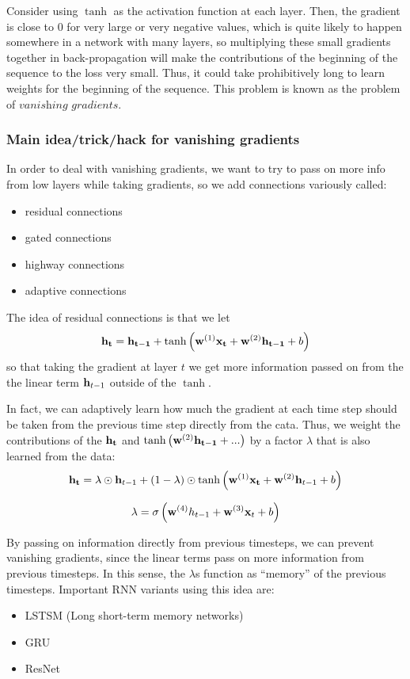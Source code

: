 \documentclass{article}
\begin{document}
\vspace{0.1in}

Consider using $\tanh$ as the activation function at each layer. Then, the gradient is close to $0$ for very large or very negative values, which is quite likely to happen somewhere in a network with many layers, so multiplying these small gradients together in back-propagation will make the contributions of the beginning of the sequence to the loss very small. Thus, it could take prohibitively long to learn weights for the beginning of the sequence. This problem is known as the problem of $\textit{vanishing gradients}$.

\subsubsection{Main idea/trick/hack for vanishing gradients}

In order to deal with vanishing gradients, we want to try to pass on more info from low layers while taking gradients, so we add connections variously called:
\begin{itemize}
    \item residual connections
    \item gated connections
    \item highway connections
    \item adaptive connections
\end{itemize}

The idea of residual connections is that we let $$\bold{h_t} = \bold{h_{t-1}} + \tanh\left(\bold{w}^{(1)} \bold{x_t} + \bold{w}^{(2)} \bold{h_{t-1}} + b\right) $$ so that taking the gradient at layer $t$ we get more information passed on from the the linear term $\bold{h}_{t-1}$ outside of the $\tanh$.

In fact, we can adaptively learn how much the gradient at each time step should be taken from the previous time step directly from the cata. Thus, we weight the contributions of the $\bold{h_t}$ and $\tanh\left(\bold{w}^{(2)} \bold{h_{t-1}} +...\right)$ by a factor $\lambda$ that is also learned from the data:
$$\bold{h_t} = \lambda \odot \bold{h}_{t-1} + (1-\lambda) \odot \tanh\left(\bold{w}^{(1)} \bold{x_t} + \bold{w}^{(2)}  \bold{h}_{t-1} + b\right)$$

$$\lambda = \sigma\left(\bold{w}^{(4)}h_{t-1} + \bold{w}^{(3)} \bold{x}_t + b \right)$$

By passing on information directly from previous timesteps, we can prevent vanishing gradients, since the linear terms pass on more information from previous timesteps. In this sense, the $\lambda$s function as ``memory'' of the previous timesteps. Important RNN variants using this idea are:
\begin{itemize}
    \item LSTSM (Long short-term memory networks)
    \item GRU
    \item ResNet
\end{itemize}
\end{document}

